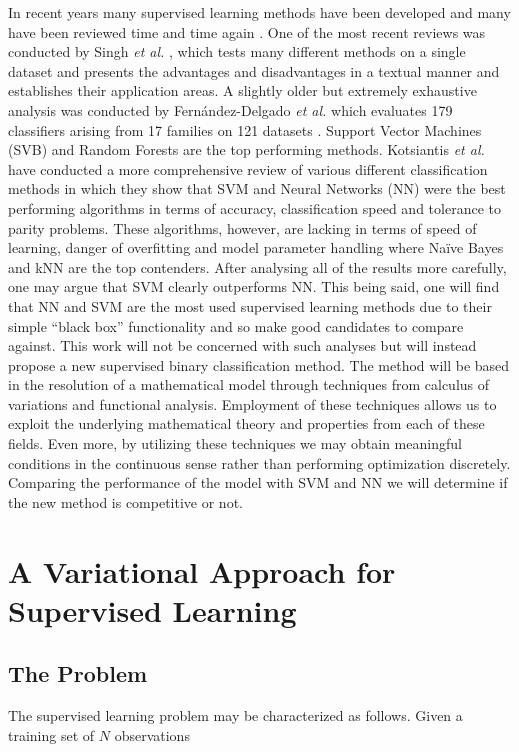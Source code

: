 \documentclass{INGUADY}
\begin{document}
In recent years many supervised learning methods have been developed and many have been reviewed time and time again \cite{asingh, fernandezdel, kotsiantis, caruana}. One of the most recent reviews was conducted by Singh \textit{et al.} \cite{asingh}, which tests many different methods on a single dataset and presents the advantages and disadvantages in a textual manner and establishes their application areas. A slightly  older but extremely exhaustive analysis was conducted by Fernández-Delgado \textit{et al.} which evaluates 179 classifiers arising from 17 families on 121 datasets \cite{fernandezdel}. Support Vector Machines (SVB) and Random Forests are the top performing methods. Kotsiantis \textit{et al.} \cite{kotsiantis} have conducted a more comprehensive review of various different classification methods in which they show that SVM and Neural Networks (NN) were the best performing algorithms in terms of accuracy, classification speed and tolerance to parity problems. These algorithms, however, are lacking in terms of speed of learning, danger of overfitting and model parameter handling where Naïve Bayes and kNN are the top contenders. After analysing all of the results more carefully, one may argue that SVM clearly outperforms NN. This being said, one will find that NN and SVM are the most used supervised learning methods due to their simple ``black box'' functionality and so make good candidates to compare against. This work will not be concerned with such analyses but will instead propose a new supervised binary classification method. The method will be based in the resolution of a mathematical model through techniques from calculus of variations and functional analysis. Employment of these techniques allows us to exploit the underlying mathematical theory and properties from each of these fields. Even more, by utilizing these techniques we may obtain meaningful conditions in the continuous sense rather than performing optimization discretely. Comparing the performance of the model with SVM and NN we will determine if the new method is competitive or not.

\section{A Variational Approach for Supervised Learning}
\subsection{The Problem}
The supervised learning problem may be characterized as follows. Given a training set of $N$ observations
\end{document}
